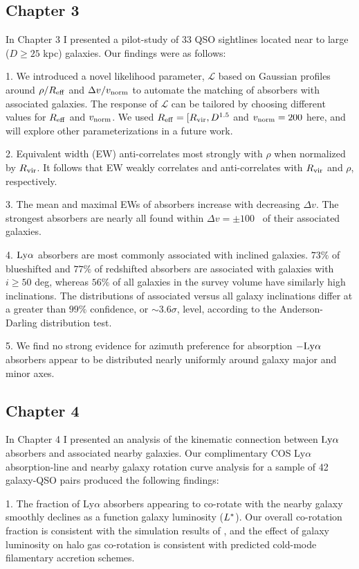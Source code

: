 \subsection{Chapter 3}
In Chapter 3 I presented a pilot-study of 33 QSO sightlines located near to large ($D \ge 25$ kpc) galaxies. Our findings were as follows:

1. We introduced a novel likelihood parameter, $\mathcal{L}$ based on Gaussian profiles around $\rho / R_{\rm eff}$ and $\Delta v / v_{\rm norm}$ to automate the matching of absorbers with associated galaxies. The response of $\mathcal{L}$ can be tailored by choosing different values for $R_{\rm eff}$ and $v_{\rm norm}$. We used $R_{\rm eff} = [R_{\rm vir}, D^{\rm 1.5}$ and $v_{\rm norm} = 200$ \kms here, and will explore other parameterizations in a future work.

2. Equivalent width (EW) anti-correlates most strongly with $\rho$ when normalized by $R_{\rm vir}$. It follows that EW weakly correlates and anti-correlates with $R_{\rm vir}$ and $\rho$, respectively.

3. The mean and maximal EWs of absorbers increase with decreasing $\Delta v$. The strongest absorbers are nearly all found within $\Delta v = \pm 100$ \kms~of their associated galaxies.

4. $\rm Ly\alpha$ absorbers are most commonly associated with inclined galaxies. $73\%$ of blueshifted and $77\%$ of redshifted absorbers are associated with galaxies with $i \ge 50$ deg, whereas $56\%$ of all galaxies in the survey volume have similarly high inclinations. The distributions of associated versus all galaxy inclinations differ at a greater than $99\%$ confidence, or $\sim 3.6 \sigma$, level, according to the Anderson-Darling distribution test.

5. We find no strong evidence for azimuth preference for absorption $-\rm Ly\alpha$ absorbers appear to be distributed nearly uniformly around galaxy major and minor axes.

\subsection{Chapter 4}
In Chapter 4 I presented an analysis of the kinematic connection between $\rm Ly\alpha$ absorbers and associated nearby galaxies. Our complimentary COS Ly$\alpha$ absorption-line and nearby galaxy rotation curve analysis for a sample of 42 galaxy-QSO pairs produced the following findings:

1. The fraction of Ly$\alpha$ absorbers appearing to co-rotate with the nearby galaxy smoothly declines as a function galaxy luminosity ($L^{\**}$). Our overall co-rotation fraction is consistent with the simulation results of \cite{stewart2011b, stewart2013}, and the effect of galaxy luminosity on halo gas co-rotation is consistent with predicted cold-mode filamentary accretion schemes. 

